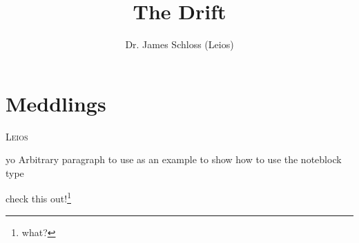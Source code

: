 \documentclass[11pt]{book}
\title{\textbf{The Drift}}
\author{Dr. James Schloss (Leios)}
\date{}
\makeatletter
\newcommand{\chapterauthor}[1]{%
  {\parindent0pt\vspace*{-25pt}%
  \linespread{1.1}\large\scshape#1%
  \par\nobreak\vspace*{35pt}}
  \@afterheading%
}
\makeatother
\begin{document}
\maketitle



\newpage

\chapter{Meddlings}
\chapterauthor{Leios}

\begin{noteblock}{yo}
Arbitrary paragraph to use as an example to show how to use the noteblock type
\end{noteblock}

check this out!\footnote{what?}
\end{document}
